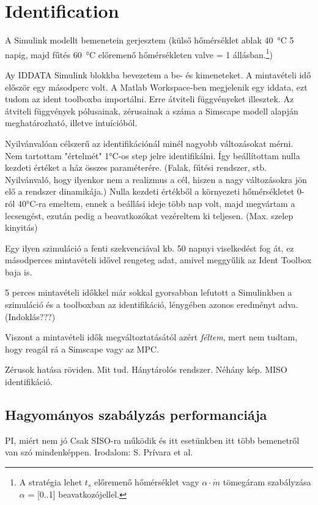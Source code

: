 \chapter{Identification}



A Simulink modellt bemenetein gerjesztem (külső hőmérséklet ablak \SI{40}{\celsius} 5 napig, majd fűtés \SI{60}{\celsius} előremenő hőmérsékleten valve = 1 állásban.\footnote{A stratégia lehet $t_s$ előremenő hőmérséklet vagy $\alpha \cdot \dot m$ tömegáram szabályzása $\alpha$ = [0..1] beavatkozójellel. })


Ay IDDATA Simulink blokkba bevezetem a be- és kimeneteket. A mintavételi idő először egy másodperc volt. A Matlab Workspace-ben megjelenik egy iddata, ezt tudom az ident toolboxba importálni. Erre átviteli függvényeket illesztek. Az átviteli függvények pólusainak, zérusainak a száma a Simscape modell alapján meghatározható, illetve intuícióból.

Nyilvánvalóan célszerű az identifikációnál minél nagyobb változásokat mérni. Nem tartottam "értelmét" 1\si{\celsius}-os step jelre identifikálni. Így beállítottam nulla kezdeti értéket a ház összes paraméterére. (Falak, fűtési rendszer, stb. Nyilvánvaló, hogy ilyenkor nem a realizmus a cél, hiszen a nagy változásokra jön elő a rendszer dinamikája.) Nulla kezdeti értékből a környezeti hőmérsékletet 0-ról 40\si{\celsius}-ra emeltem, ennek a beállási ideje több nap volt, majd megvártam a lecsengést, ezután pedig a beavatkozókat vezéreltem ki teljesen. (Max. szelep kinyitás)

Egy ilyen szimuláció a fenti szekvenciával kb. 50 napnyi viselkedést fog át, ez másodperces mintavételi idővel rengeteg adat, amivel meggyűlik az Ident Toolbox baja is.

5 perces mintavételi időkkel már sokkal gyorsabban lefutott a Simulinkben a szimuláció és a toolboxban az identifikáció, lénygében azonos eredményt adva. (Indoklás???)

Viszont a mintavételi idők megváltoztatásától azért \textit{féltem}, mert nem tudtam, hogy reagál rá a Simscape vagy az MPC.

Zérusok hatása röviden. Mit tud. Hánytárolós rendszer. Néhány kép.
MISO identifikáció. 


\section{Hagyományos szabályzás performanciája}

PI, miért nem jó
Csak SISO-ra működik és itt esetünkben itt több bemenetről van szó mindenképpen. Irodalom: S. Prívara et al. 



\pagebreak